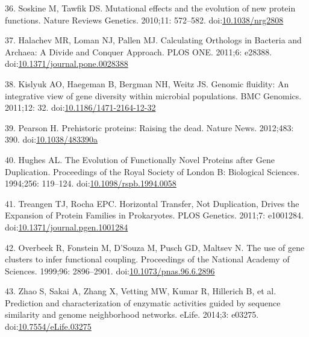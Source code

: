 \documentclass[12pt,twoside]{reedthesis}
\begin{document}
  \hypertarget{ref-soskineux5fmutationalux5f2010}{}
  36. Soskine M, Tawfik DS. Mutational effects and the evolution of new
  protein functions. Nature Reviews Genetics. 2010;11: 572--582.
  doi:\href{https://doi.org/10.1038/nrg2808}{10.1038/nrg2808}
  
  \hypertarget{ref-halachevux5fcalculatingux5f2011}{}
  37. Halachev MR, Loman NJ, Pallen MJ. Calculating Orthologs in Bacteria
  and Archaea: A Divide and Conquer Approach. PLOS ONE. 2011;6: e28388.
  doi:\href{https://doi.org/10.1371/journal.pone.0028388}{10.1371/journal.pone.0028388}
  
  \hypertarget{ref-kislyukux5fgenomicux5f2011}{}
  38. Kislyuk AO, Haegeman B, Bergman NH, Weitz JS. Genomic fluidity: An
  integrative view of gene diversity within microbial populations. BMC
  Genomics. 2011;12: 32.
  doi:\href{https://doi.org/10.1186/1471-2164-12-32}{10.1186/1471-2164-12-32}
  
  \hypertarget{ref-pearsonux5fprehistoricux5f2012}{}
  39. Pearson H. Prehistoric proteins: Raising the dead. Nature News.
  2012;483: 390.
  doi:\href{https://doi.org/10.1038/483390a}{10.1038/483390a}
  
  \hypertarget{ref-hughesux5fevolutionux5f1994}{}
  40. Hughes AL. The Evolution of Functionally Novel Proteins after Gene
  Duplication. Proceedings of the Royal Society of London B: Biological
  Sciences. 1994;256: 119--124.
  doi:\href{https://doi.org/10.1098/rspb.1994.0058}{10.1098/rspb.1994.0058}
  
  \hypertarget{ref-treangenux5fhorizontalux5f2011}{}
  41. Treangen TJ, Rocha EPC. Horizontal Transfer, Not Duplication, Drives
  the Expansion of Protein Families in Prokaryotes. PLOS Genetics. 2011;7:
  e1001284.
  doi:\href{https://doi.org/10.1371/journal.pgen.1001284}{10.1371/journal.pgen.1001284}
  
  \hypertarget{ref-overbeekux5fuseux5f1999}{}
  42. Overbeek R, Fonstein M, D'Souza M, Pusch GD, Maltsev N. The use of
  gene clusters to infer functional coupling. Proceedings of the National
  Academy of Sciences. 1999;96: 2896--2901.
  doi:\href{https://doi.org/10.1073/pnas.96.6.2896}{10.1073/pnas.96.6.2896}
  
  \hypertarget{ref-zhaoux5fpredictionux5f2014}{}
  43. Zhao S, Sakai A, Zhang X, Vetting MW, Kumar R, Hillerich B, et al.
  Prediction and characterization of enzymatic activities guided by
  sequence similarity and genome neighborhood networks. eLife. 2014;3:
  e03275.
  doi:\href{https://doi.org/10.7554/eLife.03275}{10.7554/eLife.03275}
  
\end{document}
